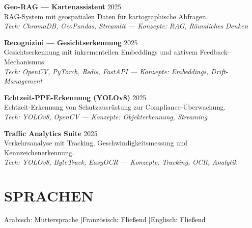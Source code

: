 \documentclass[a4paper,12pt]{article}
\begin{document}
{\textbf{Geo-RAG — Kartenassistent} \hfill 2025 \\
RAG-System mit geospatialen Daten für kartographische Abfragen. \\
\textit{Tech: ChromaDB, GeoPandas, Streamlit — Konzepte: RAG, Räumliches Denken}

\textbf{Recognizini — Gesichtserkennung} \hfill 2025 \\
Gesichtserkennung mit inkrementellen Embeddings und aktivem Feedback-Mechanismus. \\
\textit{Tech: OpenCV, PyTorch, Redis, FastAPI — Konzepte: Embeddings, Drift-Management}

\textbf{Echtzeit-PPE-Erkennung (YOLOv8)} \hfill 2025 \\
Echtzeit-Erkennung von Schutzausrüstung zur Compliance-Überwachung. \\
\textit{Tech: YOLOv8, OpenCV — Konzepte: Objekterkennung, Streaming}

\textbf{Traffic Analytics Suite} \hfill 2025 \\
Verkehrsanalyse mit Tracking, Geschwindigkeitsmessung und Kennzeichenerkennung. \\
\textit{Tech: YOLOv8, ByteTrack, EasyOCR — Konzepte: Tracking, OCR, Analytik}


}

\section{SPRACHEN}
Arabisch: Muttersprache \quad|\quad Französisch: Fließend \quad|\quad Englisch: Fließend
\end{document}
